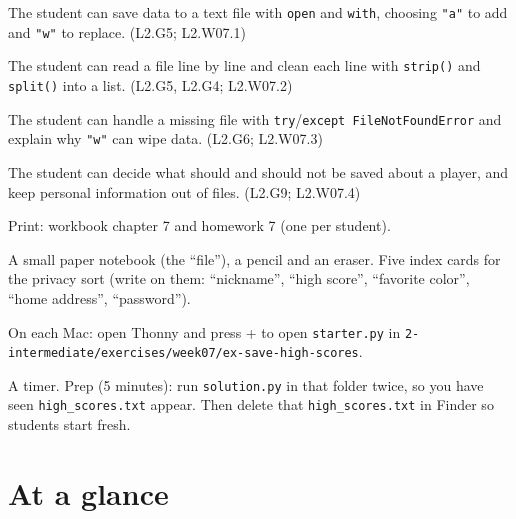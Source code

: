 
\begin{objectives}
  \item The student can save data to a text file with \texttt{open} and \texttt{with}, choosing \texttt{"a"} to add and \texttt{"w"} to replace. (L2.G5; L2.W07.1)
  \item The student can read a file line by line and clean each line with \texttt{strip()} and \texttt{split()} into a list. (L2.G5, L2.G4; L2.W07.2)
  \item The student can handle a missing file with \texttt{try}/\texttt{except FileNotFoundError} and explain why \texttt{"w"} can wipe data. (L2.G6; L2.W07.3)
  \item The student can decide what should and should not be saved about a player, and keep personal information out of files. (L2.G9; L2.W07.4)
\end{objectives}

\begin{materials}
  \item Print: workbook chapter 7 and homework 7 (one per student).
  \item A small paper notebook (the \enquote{file}), a pencil and an eraser. Five index cards for the privacy sort (write on them: \enquote{nickname}, \enquote{high score}, \enquote{favorite color}, \enquote{home address}, \enquote{password}).
  \item On each Mac: open Thonny and press + to open \texttt{starter.py} in \texttt{2-intermediate/exercises/week07/ex-save-high-scores}.
  \item A timer. Prep (5 minutes): run \texttt{solution.py} in that folder twice, so you have seen \texttt{high\_scores.txt} appear. Then delete that \texttt{high\_scores.txt} in Finder so students start fresh.
\end{materials}

\section{At a glance}
\begin{timeplan}
\end{timeplan}

